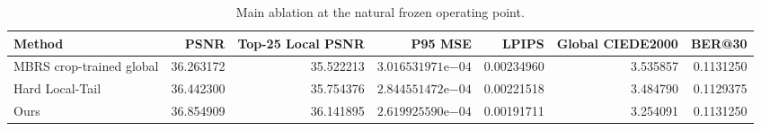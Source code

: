 \begin{table}[t]
  \centering
  \caption{Main ablation at the natural frozen operating point.}
  \label{tab:main-ablation}
  \small
  \begin{tabular}{lrrrrrr}
    \hline
    Method & PSNR & Top-25 Local PSNR & P95 MSE & LPIPS & Global CIEDE2000 & BER@30 \\
    \hline
    MBRS crop-trained global & 36.263172 & 35.522213 & $3.016531971\mathrm{e}{-04}$ & 0.00234960 & 3.535857 & 0.1131250 \\
    Hard Local-Tail & 36.442300 & 35.754376 & $2.844551472\mathrm{e}{-04}$ & 0.00221518 & 3.484790 & 0.1129375 \\
    Ours & 36.854909 & 36.141895 & $2.619925590\mathrm{e}{-04}$ & 0.00191711 & 3.254091 & 0.1131250 \\
    \hline
  \end{tabular}
\end{table}
